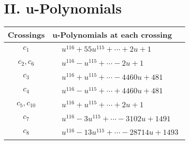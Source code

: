 \documentclass[1p]{elsarticle_modified}
\theoremstyle{definition}
\begin{document}
\newpage\renewcommand{\arraystretch}{1}
\centering \section*{ II. u-Polynomials}
\begin{tabular}{m{50pt}|m{274pt}}
Crossings & \hspace{64pt}u-Polynomials at each crossing \\
\hline $$\begin{aligned}c_{1}\end{aligned}$$&$\begin{aligned}
&u^{116}+55 u^{115}+\cdots+2 u+1
\end{aligned}$\\
\hline $$\begin{aligned}c_{2},c_{6}\end{aligned}$$&$\begin{aligned}
&u^{116}- u^{115}+\cdots-2 u+1
\end{aligned}$\\
\hline $$\begin{aligned}c_{3}\end{aligned}$$&$\begin{aligned}
&u^{116}+u^{115}+\cdots-4460 u+481
\end{aligned}$\\
\hline $$\begin{aligned}c_{4}\end{aligned}$$&$\begin{aligned}
&u^{116}- u^{115}+\cdots+4460 u+481
\end{aligned}$\\
\hline $$\begin{aligned}c_{5},c_{10}\end{aligned}$$&$\begin{aligned}
&u^{116}+u^{115}+\cdots+2 u+1
\end{aligned}$\\
\hline $$\begin{aligned}c_{7}\end{aligned}$$&$\begin{aligned}
&u^{116}-3 u^{115}+\cdots-3102 u+1491
\end{aligned}$\\
\hline $$\begin{aligned}c_{8}\end{aligned}$$&$\begin{aligned}
&u^{116}-13 u^{115}+\cdots-28714 u+1493
\end{aligned}$\\

\end{tabular}
\end{document}
